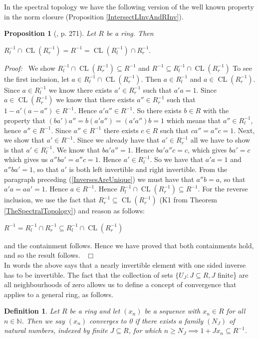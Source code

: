 \documentclass[12pt, oneside]{book}
\newtheorem{proposition}[theorem]{Proposition}
\newtheorem{definition}[theorem]{Definition}
\newcommand{\proof}{{\noindent \it Proof:~}}
\newcommand{\qed}{\hfill ~$\Box$\\}
\def\CL{\operatorname{CL}}
\begin{document}
\noindent In the spectral topology we have the following version of the well known property in the 
norm closure (Proposition \ref{IntersectLInvAndRInv}).

\begin{proposition}[\cite{CH3}, p. 271]
\normalfont
\noindent Let $R$ be a ring. Then 
\begin{center}
$R_l^{-1} \cap \CL(R_r^{-1}) = R^{-1} = \CL(R_l^{-1}) \cap R_r^{-1}.$
\end{center}
\end{proposition}

\proof \space 
We show $R_l^{-1} \cap \CL(R_r^{-1}) \subseteq R^{-1}$ and $R^{-1} \subseteq R_l^{-1} \cap \CL(R_r^{-1})$
\vskip 0.3cm
\noindent To see the first inclusion, let $a \in R^{-1}_l \cap \CL(R^{-1}_r)$. Then $a \in R^{-1}_l$ 
and $a \in \CL(R^{-1}_r)$. Since $a \in R^{-1}_l$ we know there exists $a' \in R^{-1}_r$ 
such that $a'a = 1$. Since $a \in \CL(R^{-1}_r)$ we know that there exists $a'' \in R^{-1}_r$ such that 
$1 - a'(a - a'') \in R^{-1}$. Hence $a'a'' \in R^{-1}$. So there exists $b \in R$ with the property that 
$(ba')a'' = b(a'a'') = (a'a'')b = 1$ which means that $a'' \in R^{-1}_l$, 
hence $a'' \in R^{-1}$. Since $a'' \in R^{-1}$ there exists $c \in R$ such that $ca'' = a''c = 1$.
\vskip 0.3cm
\noindent Next, we show that $a' \in R^{-1}$. Since we already have that $a' \in R^{-1}_r$ all we have 
to show is that $a' \in R^{-1}_l$. We know that $ba'a'' = 1$. Hence $ba'a''c = c$, which gives 
$ba' = c$ which gives us $a''ba'=a''c = 1$. Hence $a' \in R^{-1}_l$. So we have that $a'a = 1$ 
and $a''ba' = 1$, so that $a'$ is both left invertible and right invertible. From the paragraph 
preceding (\ref{InversesAreUnique}) we must have that $a''b = a$, so that $a'a = aa' = 1$. 
Hence $a \in R^{-1}$. Hence $R_l^{-1} \cap \CL(R_r^{-1}) \subseteq R^{-1}$.
\vskip 0.3cm
\noindent For the reverse inclusion, we use the fact that $R^{-1}_r \subseteq \CL(R^{-1}_r)$ 
(K1 from Theorem \ref{TheSpectralTopology}) and reason as follows:
\begin{center}
$R^{-1} = R^{-1}_l \cap R^{-1}_r \subseteq R^{-1}_l \cap \CL(R^{-1}_r)$
\end{center}
and the containment follows. Hence we have proved that both containments hold, and so the result follows.
\qed
\vskip 0.3cm
\noindent In words the above says that a nearly invertible element with one sided inverse has to be invertible.
\vskip 0.3cm
\noindent The fact that the collection of sets $\{U_J : J \subseteq R, J$ finite\} are all 
neighbourhoods of zero allows us to define a concept of convergence that applies to a general ring, 
as follows.  
\newpage
\begin{definition} \label{RingConvergence}
\normalfont
\noindent Let $R$ be a ring and let $(x_n)$ be a sequence with $x_n \in R$ for all 
$n \in \mathbb{N}$. Then we say $(x_n)$ converges to 0 if there exists a family $(N_J)$ of 
natural numbers, indexed by finite $J \subseteq R$, for which 
$n \geqslant N_J \implies 1+Jx_n \subseteq R^{-1}$.
\end{definition}
\vskip 2cm
\begin{center}
\maltese
\end{center}
\end{document}
